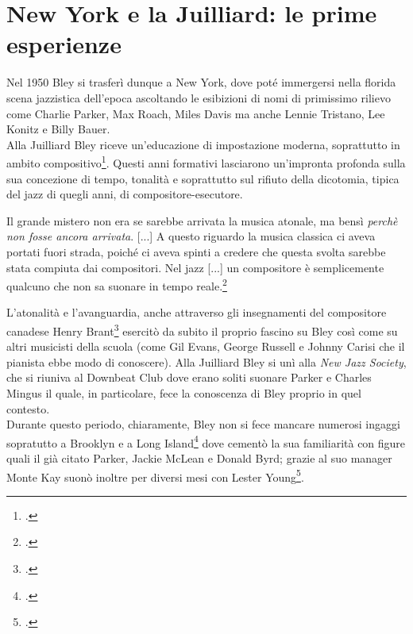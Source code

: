 \section{New York e la Juilliard: le prime esperienze}
Nel 1950 Bley si trasferì dunque a New York, dove poté immergersi nella florida scena jazzistica dell'epoca ascoltando le esibizioni di nomi di primissimo rilievo come Charlie Parker, Max Roach, Miles Davis ma anche Lennie Tristano, Lee Konitz e Billy Bauer.\\
Alla Juilliard Bley riceve un'educazione di impostazione moderna, soprattutto in ambito compositivo\footcite[23]{stopping}. Questi anni formativi lasciarono un'impronta profonda sulla sua concezione di tempo, tonalità e soprattutto sul rifiuto della dicotomia, tipica del jazz di quegli anni, di compositore-esecutore.
\begin{fquote}
	Il grande mistero non era se sarebbe arrivata la musica atonale, ma bensì \textit{perchè non fosse ancora arrivata}. [...] A questo riguardo la musica classica ci aveva portati fuori strada, poiché ci aveva spinti a credere che questa svolta sarebbe stata compiuta dai compositori. Nel jazz [...] un compositore è semplicemente qualcuno che non sa suonare in tempo reale.\footcite[24]{stopping}
\end{fquote}
L'atonalità e l'avanguardia, anche attraverso gli insegnamenti del compositore canadese Henry Brant\footcite[23]{stopping} esercitò da subito il proprio fascino su Bley così come su altri musicisti della scuola (come Gil Evans, George Russell e Johnny Carisi che il pianista ebbe modo di conoscere). Alla Juilliard Bley si unì alla \textit{New Jazz Society}, che si riuniva al Downbeat Club dove erano soliti suonare Parker e Charles Mingus il quale, in particolare, fece la conoscenza di Bley proprio in quel contesto.\\
Durante questo periodo, chiaramente, Bley non si fece mancare numerosi ingaggi sopratutto a Brooklyn e a Long Island\footcite[47]{cappelletti} dove cementò la sua familiarità con figure quali il già citato Parker, Jackie McLean e Donald Byrd; grazie al suo manager Monte Kay suonò inoltre per diversi mesi con Lester Young\footcite[47]{cappelletti}.\par
